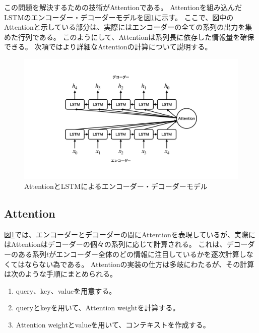 この問題を解決するための技術がAttentionである。
Attentionを組み込んだLSTMのエンコーダー・デコーダーモデルを図\ref{19EncoderDecoderAttention}に示す。
ここで、図中のAttentionと示している部分は、実際にはエンコーダーの全ての系列の出力を集めた行列である。
このようにして、Attentionは系列長に依存した情報量を確保できる。
次項ではより詳細なAttentionの計算について説明する。

\begin{figure}[htbp]
 \centering
 \includegraphics[trim = 100 100 100 100, width=1.0\textwidth, clip]{Figure/2DeepLearning/19EncoderDecoderAttention.png}
 \caption{AttentionとLSTMによるエンコーダー・デコーダーモデル}
 \label{19EncoderDecoderAttention}
\end{figure}


\subsection{Attention} \label{DL:Atten:Attention}

図\ref{19EncoderDecoderAttention}では、エンコーダーとデコーダーの間にAttentionを表現しているが、実際にはAttentionはデコーダーの個々の系列に応じて計算される。
これは、デコーダーのある系列$t$がエンコーダー全体のどの情報に注目しているかを逐次計算しなくてはならない為である。
Attentionの実装の仕方は多岐にわたるが、その計算は次のような手順にまとめられる。

\begin{enumerate}
  \item query、key、valueを用意する。
  \item queryとkeyを用いて、Attention weightを計算する。
  \item Attention weightとvalueを用いて、コンテキストを作成する。
\end{enumerate}


